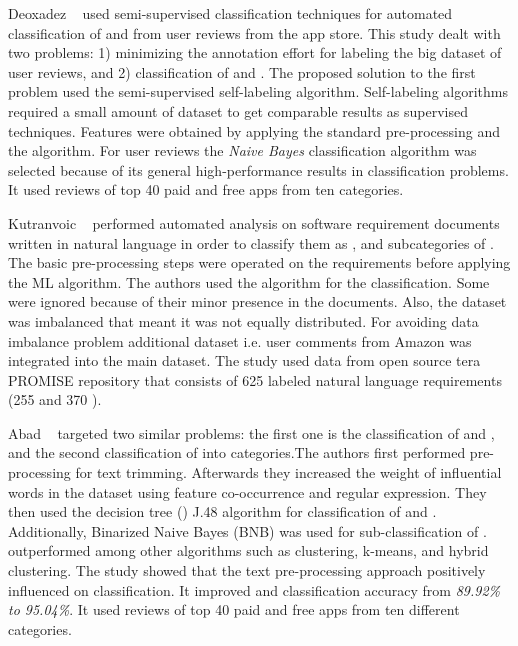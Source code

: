 Deoxadez \etal~\cite{Deocadez:2017} used semi-supervised classification
techniques for automated classification of \FR and \NFR from user reviews from
the app store. This study dealt with two problems: 1) minimizing the annotation
effort for labeling the big dataset of user reviews, and 2) classification of
\FR and \NFR. The proposed solution to the first problem used the
semi-supervised self-labeling algorithm. Self-labeling algorithms required a
small amount of dataset to get comparable results as supervised techniques.
Features were obtained by applying the standard pre-processing and the \BOW
algorithm. For user reviews the \emph{Naive Bayes} classification algorithm was
selected because of its general high-performance results in classification
problems. It used reviews of top 40 paid and free apps from ten
categories.

Kutranvoic \etal ~ \cite {Kurtanovic:2017} performed automated analysis on
software requirement documents written in natural language in order to classify
them as \FRs, \NFRs and subcategories of \NFRs. The basic pre-processing steps
were operated on the requirements before applying the ML algorithm. The authors
used the \SVM algorithm for the classification.
Some \NFR were ignored because of their minor presence in the documents. Also,
the dataset was imbalanced that meant it was not equally distributed. For avoiding data imbalance problem additional
dataset i.e. user comments from Amazon was integrated into
the main dataset.
The study used data from open source tera PROMISE repository that consists of
625 labeled natural language requirements (255 \FR [40.8\%] and 370
\NFR[59.2\%]).

Abad \etal~\cite{Abad:2017} targeted two similar problems: the first one is the
classification of \FR and \NFR, and the second classification of \NFR into
categories.The authors first performed pre-processing for text trimming.
Afterwards they increased the weight of influential words in the dataset using
feature co-occurrence and regular expression. They then used the decision tree
(\DT) J.48 algorithm for classification of \FRs and \NFR.
Additionally, Binarized Naive Bayes (BNB) was used for sub-classification of
\NFR. \Bnb outperformed among other algorithms such as clustering, k-means, and
hybrid clustering. The study showed that the text pre-processing approach
positively influenced on classification. It improved \FR and \NFR
 classification accuracy from \textit{89.92\% to 95.04\%}. It used reviews of
 top 40 paid and free apps from ten
different categories.

